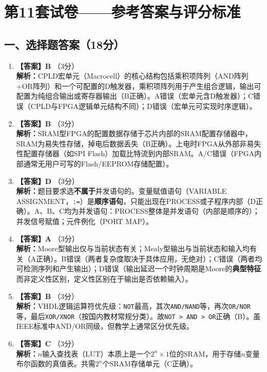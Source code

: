 \chapter{第11套试卷——参考答案与评分标准}

\section{一、选择题答案（18分）}

\begin{enumerate}[label=\arabic*.]

\item \textbf{【答案】B} \quad（3分）\\
\textbf{解析：}CPLD宏单元（Macrocell）的核心结构包括乘积项阵列（AND阵列+OR阵列）和一个可配置的D触发器，乘积项阵列用于产生组合逻辑，输出可配置为纯组合输出或寄存器输出（B正确）。A错误（宏单元含D触发器）；C错误（CPLD与FPGA逻辑单元结构不同）；D错误（宏单元可实现时序逻辑）。

\item \textbf{【答案】B} \quad（3分）\\
\textbf{解析：}SRAM型FPGA的配置数据存储于芯片内部的SRAM配置存储器中，SRAM为易失性存储，掉电后数据丢失（B正确）。上电时FPGA从外部非易失性配置存储器（如SPI Flash）加载比特流到内部SRAM。A/C错误（FPGA内部通常无用户可写的Flash/EEPROM存储配置）。

\item \textbf{【答案】D} \quad（3分）\\
\textbf{解析：}题目要求选\textbf{不属于}并发语句的。变量赋值语句（VARIABLE ASSIGNMENT，\texttt{:=}）是\textbf{顺序语句}，只能出现在PROCESS或子程序内部（D正确）。A、B、C均为并发语句：PROCESS整体是并发语句（内部是顺序的）；并发信号赋值；元件例化（PORT MAP）。

\item \textbf{【答案】A} \quad（3分）\\
\textbf{解析：}Moore型输出仅与当前状态有关；Mealy型输出与当前状态和输入均有关（A正确）。B错误（两者复杂度取决于具体应用，无绝对）；C错误（两者均可检测序列和产生输出）；D错误（输出延迟一个时钟周期是Moore的\textbf{典型特征}而非定义性区别，定义性区别在于输出是否依赖输入）。

\item \textbf{【答案】B} \quad（3分）\\
\textbf{解析：}VHDL逻辑运算符优先级：\texttt{NOT}最高，其次\texttt{AND/NAND}等，再次\texttt{OR/NOR}等，最后\texttt{XOR/XNOR}（按国内教材常规分类）。故\texttt{NOT > AND > OR}正确（B）。虽IEEE标准中AND/OR同级，但教学上通常区分优先级。

\item \textbf{【答案】C} \quad（3分）\\
\textbf{解析：}$n$输入查找表（LUT）本质上是一个$2^n\times1$位的SRAM，用于存储$n$变量布尔函数的真值表。共需$2^n$个SRAM存储单元（C正确）。

\end{enumerate}

